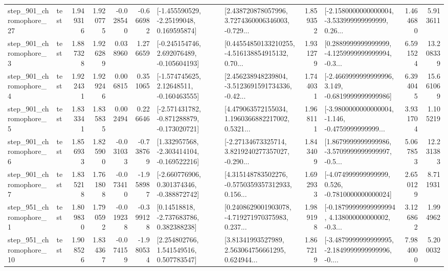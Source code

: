 \begin{tabular}{llrrrrllrlrr}
  step\_901\_chromophore\_27 &      test &      1.949316 &    1.920775 &     -0.028540 & -0.666982 &    [-1.455590529, -2.25199048, 0.169595874] &  [2.438720878057996, 3.7274360006346003, -0.729... &       1.859352 &  [-2.1580000000000004, -3.533999999999999, 0.26... &            1.464680 &          5.913611 \\
   step\_901\_chromophore\_3 &      test &      1.887328 &    1.926289 &      0.038960 &  1.276659 &   [-0.245154746, 2.692076489, -0.105604193] &  [0.44554850133210255, -4.516138854915132, 0.70... &       1.931279 &  [0.2889999999999999, -4.1259999999999994, -0.3... &            6.591524 &         13.208339 \\
   step\_901\_chromophore\_4 &      test &      1.922431 &    1.929246 &      0.006815 &  0.351065 &    [-1.574745625, 2.12648511, -0.160463555] &  [2.456238948239804, -3.5123691591734336, -0.42... &       1.744031 &  [-2.4669999999999996, 3.149, -0.6819999999999986] &            6.394045 &         15.661069 \\
   step\_901\_chromophore\_5 &      test &      1.833341 &    1.835835 &      0.002494 &  0.226646 &  [-2.571431782, -0.871288879, -0.173020721] &  [4.479063572155034, 1.1960366882217002, 0.5321... &       1.968111 &  [-3.9800000000000004, -1.146, -0.4759999999999... &            3.931704 &          1.105219 \\
   step\_901\_chromophore\_6 &      test &      1.856933 &    1.825900 &     -0.031033 & -0.738769 &   [1.332957568, -2.303414104, -0.169522216] &  [-2.27134673325714, 3.8219240277357027, -0.290... &       1.843409 &  [1.8679999999999986, -3.5709999999999997, -0.5... &            5.067853 &         12.231383 \\
   step\_901\_chromophore\_7 &      test &      1.835218 &    1.761808 &     -0.073410 & -1.958987 &   [-2.660776906, 0.301374346, -0.388872742] &  [4.315148783502276, -0.5750359357312933, 0.156... &       1.692933 &   [-4.074999999999999, 0.526, -0.7810000000000024] &            2.650129 &          8.711931 \\
   step\_951\_chromophore\_1 &      test &      1.809830 &    1.790592 &     -0.019238 & -0.399128 &     [0.14518818, -2.737683786, 0.382388238] &  [0.2408629001903078, -4.719271970375983, 0.237... &       1.989198 &  [-0.18799999999999994, 4.138000000000002, -0.3... &            3.126862 &          1.994962 \\
  step\_951\_chromophore\_10 &      test &      1.908526 &    1.834367 &     -0.074159 & -1.980534 &     [2.254802766, 1.541549516, 0.507783547] &  [3.81341993527989, 2.563064756661295, 0.624944... &       1.867219 &  [-3.4879999999999995, -2.1849999999999996, -0.... &            7.984000 &          5.200032 \\

\end{tabular}
